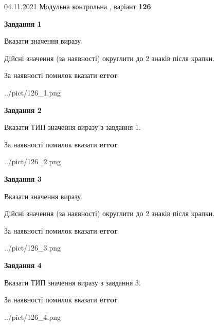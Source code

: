 \documentclass[11pt, ukrainian]{article}
\begin{document}
{04.11.2021 Модульна контрольна , варіант  \No \textbf { 126 }\par}
{
\begin {large}
{\begin {center}\textbf{Завдання 1}\end {center}}\par
Вказати значення виразу. \par
Дійсні значення (за наявності) округлити до 2 знаків після крапки. \par
За наявності помилок вказати \textbf{error}

\begin{center}
	{../pict/126_1.png}
\end{center}
\newpage

{\begin {center}\textbf{Завдання 2}\end {center}}\par
Вказати ТИП значення виразу з завдання 1. \par
За наявності помилок вказати \textbf{error}

\begin{center}
	{../pict/126_2.png}
\end{center}
\newpage

{\begin {center}\textbf{Завдання 3}\end {center}}\par
Вказати значення виразу. \par
Дійсні значення (за наявності) округлити до 2 знаків після крапки. \par
За наявності помилок вказати \textbf{error}

\begin{center}
	{../pict/126_3.png}
\end{center}
\newpage

{\begin {center}\textbf{Завдання 4}\end {center}}\par
Вказати ТИП значення виразу з завдання 3. \par
За наявності помилок вказати \textbf{error}

\begin{center}
	{../pict/126_4.png}
\end{center}
\newpage


\end{large}}
\end{document}
